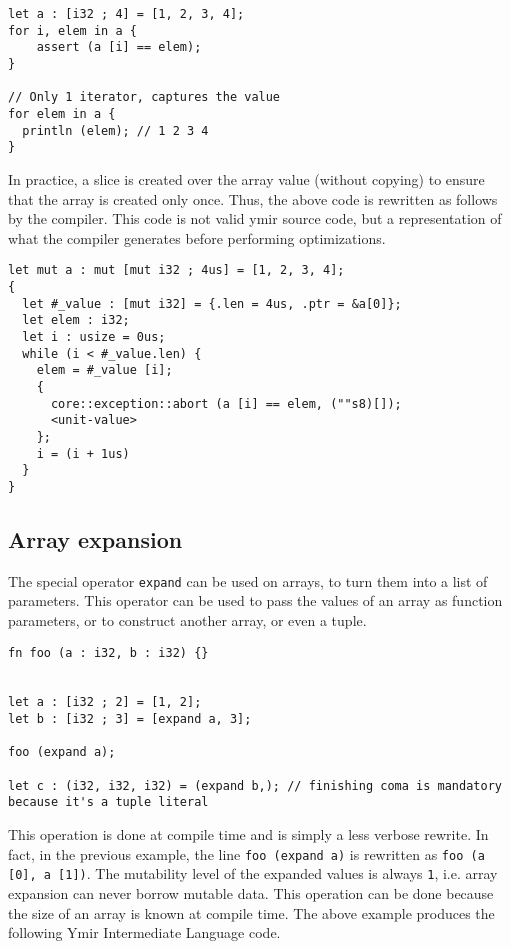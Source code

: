 \begin{lstlisting}[style=coloredverbatim]
let a : [i32 ; 4] = [1, 2, 3, 4];
for i, elem in a {
    assert (a [i] == elem);
}

// Only 1 iterator, captures the value
for elem in a {
  println (elem); // 1 2 3 4
}
\end{lstlisting}

In practice, a slice is created over the array value (without copying) to ensure
that the array is created only once. Thus, the above code is rewritten as
follows by the compiler. This code is not valid ymir source code, but a
representation of what the compiler generates before performing optimizations.

\begin{lstlisting}[style=intermediateVerb]
let mut a : mut [mut i32 ; 4us] = [1, 2, 3, 4];
{
  let #_value : [mut i32] = {.len = 4us, .ptr = &a[0]};
  let elem : i32;
  let i : usize = 0us;
  while (i < #_value.len) {
    elem = #_value [i];
    {
      core::exception::abort (a [i] == elem, (""s8)[]);
      <unit-value>
    };
    i = (i + 1us)
  }
}
\end{lstlisting}


\subsection {Array expansion}

The special operator \texttt{expand} can be used on arrays, to turn them into a
list of parameters. This operator can be used to pass the values of an array as
function parameters, or to construct another array, or even a tuple.

\begin{lstlisting}[style=coloredverbatim]
fn foo (a : i32, b : i32) {}


let a : [i32 ; 2] = [1, 2];
let b : [i32 ; 3] = [expand a, 3];

foo (expand a);

let c : (i32, i32, i32) = (expand b,); // finishing coma is mandatory because it's a tuple literal
\end{lstlisting}

This operation is done at compile time and is simply a less verbose rewrite. In
fact, in the previous example, the line \texttt{foo (expand a)} is rewritten as
\texttt{foo (a [0], a [1])}. The mutability level of the expanded values is
always \texttt{1}, i.e. array expansion can never borrow mutable data. This
operation can be done because the size of an array is known at compile time. The
above example produces the following Ymir Intermediate Language code.

